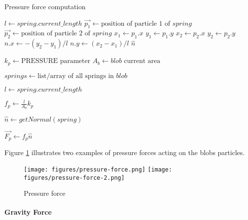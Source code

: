\documentclass[manuscript, screen]{timtm}
\begin{document}
\begin{algorithm}
\caption{Pressure force computation} \label{algo:pressure-force}
\begin{algorithmic}[1]

    \State $l \gets spring.current\_length$
    \State $\vec{p_1} \gets \text{position of particle 1 of }spring$
    \State $\vec{p_2} \gets \text{position of particle 2 of }spring$
    \State $x_1 \gets p_1.x$
    \State $y_1 \gets p_1.y$
    \State $x_2 \gets p_2.x$
    \State $y_2 \gets p_2.y$
    \State $n.x \gets -(y_2-y_1)/l$
    \State $n.y \gets (x_2-x_1)/l$
    \State \Return $\hat{n}$
\EndFunction


    \State $k_p \gets \text{PRESSURE parameter}$
    \State $A_b \gets blob \text{ current area}$
    
    \State $springs \gets \text{list/array of all springs in } blob$


        \State $l \gets spring.current\_length$

        \State $f_p \gets \frac{l}{A_b}k_p $

        \State $\hat{n} \gets getNormal(spring)$

        \State $\vec{F_p} \gets f_p \hat{n}$

        \State {}
        \State {}
        
    \EndFor
\EndFor
\end{algorithmic}
\end{algorithm}

Figure \ref{fig:pressure-force} illustrates two examples of pressure forces acting on the blobs particles.

\begin{figure}[h]
  \centering
  \texttt{[image: figures/pressure-force.png]}
  \texttt{[image: figures/pressure-force-2.png]}
  \caption{Pressure force}
  \label{fig:pressure-force}
\end{figure}

\paragraph{Gravity Force}
\end{document}
